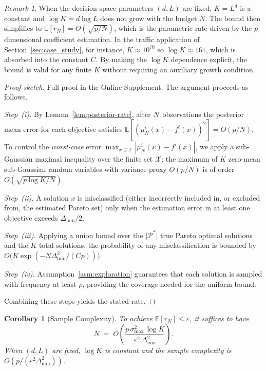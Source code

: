 \documentclass[12pt]{article}
\theoremstyle{plain}
\newtheorem{corollary}{Corollary}[section]
\theoremstyle{definition}
\theoremstyle{remark}
\newtheorem{remark}{Remark}[section]
\begin{document}
\begin{remark}\label{rem:logK}
When the decision-space parameters $(d, L)$ are fixed, $K = L^d$ is a constant
and $\log K = d \log L$ does not grow with the budget $N$.  The bound then simplifies to
$\mathbb{E}[r_N] = O(\sqrt{p/N})$, which is the parametric rate driven by the
$p$-dimensional coefficient estimation.  In the traffic application of
Section~\ref{sec:case_study}, for instance, $K \approx 10^{70}$ so
$\log K \approx 161$, which is absorbed into the constant $C$.  By making
the $\log K$ dependence explicit, the bound is valid for any finite $K$
without requiring an auxiliary growth condition.
\end{remark}

\begin{proof}[Proof sketch]
Full proof in the Online Supplement.  The argument proceeds as follows.

\emph{Step~(i).}
By Lemma~\ref{lem:posterior-rate}, after $N$~observations the posterior
mean error for each objective satisfies
$\mathbb{E}[(\mu_{N}^{i}(x)-f^{i}(x))^{2}]=O(p/N)$.  To control the
\emph{worst-case} error $\max_{x\in\mathcal{X}}|\mu_N^i(x)-f^i(x)|$,
we apply a sub-Gaussian maximal inequality over the finite set $\mathcal{X}$:
the maximum of $K$ zero-mean sub-Gaussian random variables with variance
proxy $O(p/N)$ is of order $O(\sqrt{p\log K/N})$.

\emph{Step~(ii).}
A solution $x$ is misclassified (either incorrectly included in, or
excluded from, the estimated Pareto set) only when the estimation error
in at least one objective exceeds $\Delta_{\min}/2$.

\emph{Step~(iii).}
Applying a union bound over the $\lvert\mathcal{P}^{*}\rvert$ true Pareto
optimal solutions and the $K$ total solutions, the probability of any
misclassification is bounded by
$O\!\bigl(K\exp(-N\Delta_{\min}^{2}/(Cp))\bigr)$.

\emph{Step~(iv).}
Assumption~\ref{asm:exploration} guarantees that each solution is sampled
with frequency at least $\rho$, providing the coverage needed for the
uniform bound.

Combining these steps yields the stated rate.
\end{proof}

\begin{corollary}[Sample Complexity]\label{cor:sample-complexity}
To achieve $\mathbb{E}[r_{N}]\le\varepsilon$, it suffices to have
\[
  N \;=\; O\!\left(
    \frac{p\,\sigma_{\max}^{2}\,\log K}
         {\varepsilon^{2}\,\Delta_{\min}^{2}}
  \right).
\]
When $(d,L)$ are fixed, $\log K$ is constant and the sample complexity is
$O(p/(\varepsilon^2 \Delta_{\min}^2))$.
\end{corollary}
\end{document}
